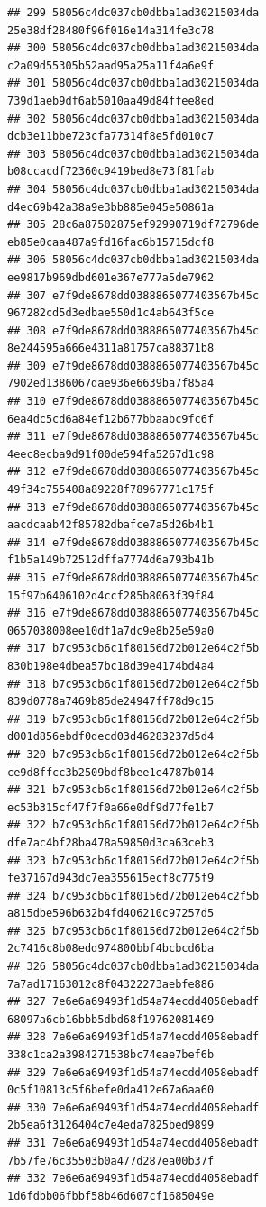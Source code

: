 \documentclass[]{article}
\begin{document}
\begin{verbatim}
## 299 58056c4dc037cb0dbba1ad30215034da     25e38df28480f96f016e14a314fe3c78
## 300 58056c4dc037cb0dbba1ad30215034da     c2a09d55305b52aad95a25a11f4a6e9f
## 301 58056c4dc037cb0dbba1ad30215034da     739d1aeb9df6ab5010aa49d84ffee8ed
## 302 58056c4dc037cb0dbba1ad30215034da     dcb3e11bbe723cfa77314f8e5fd010c7
## 303 58056c4dc037cb0dbba1ad30215034da     b08ccacdf72360c9419bed8e73f81fab
## 304 58056c4dc037cb0dbba1ad30215034da     d4ec69b42a38a9e3bb885e045e50861a
## 305 28c6a87502875ef92990719df72796de     eb85e0caa487a9fd16fac6b15715dcf8
## 306 58056c4dc037cb0dbba1ad30215034da     ee9817b969dbd601e367e777a5de7962
## 307 e7f9de8678dd0388865077403567b45c     967282cd5d3edbae550d1c4ab643f5ce
## 308 e7f9de8678dd0388865077403567b45c     8e244595a666e4311a81757ca88371b8
## 309 e7f9de8678dd0388865077403567b45c     7902ed1386067dae936e6639ba7f85a4
## 310 e7f9de8678dd0388865077403567b45c     6ea4dc5cd6a84ef12b677bbaabc9fc6f
## 311 e7f9de8678dd0388865077403567b45c     4eec8ecba9d91f00de594fa5267d1c98
## 312 e7f9de8678dd0388865077403567b45c     49f34c755408a89228f78967771c175f
## 313 e7f9de8678dd0388865077403567b45c     aacdcaab42f85782dbafce7a5d26b4b1
## 314 e7f9de8678dd0388865077403567b45c     f1b5a149b72512dffa7774d6a793b41b
## 315 e7f9de8678dd0388865077403567b45c     15f97b6406102d4ccf285b8063f39f84
## 316 e7f9de8678dd0388865077403567b45c     0657038008ee10df1a7dc9e8b25e59a0
## 317 b7c953cb6c1f80156d72b012e64c2f5b     830b198e4dbea57bc18d39e4174bd4a4
## 318 b7c953cb6c1f80156d72b012e64c2f5b     839d0778a7469b85de24947ff78d9c15
## 319 b7c953cb6c1f80156d72b012e64c2f5b     d001d856ebdf0decd03d46283237d5d4
## 320 b7c953cb6c1f80156d72b012e64c2f5b     ce9d8ffcc3b2509bdf8bee1e4787b014
## 321 b7c953cb6c1f80156d72b012e64c2f5b     ec53b315cf47f7f0a66e0df9d77fe1b7
## 322 b7c953cb6c1f80156d72b012e64c2f5b     dfe7ac4bf28ba478a59850d3ca63ceb3
## 323 b7c953cb6c1f80156d72b012e64c2f5b     fe37167d943dc7ea355615ecf8c775f9
## 324 b7c953cb6c1f80156d72b012e64c2f5b     a815dbe596b632b4fd406210c97257d5
## 325 b7c953cb6c1f80156d72b012e64c2f5b     2c7416c8b08edd974800bbf4bcbcd6ba
## 326 58056c4dc037cb0dbba1ad30215034da     7a7ad17163012c8f04322273aebfe886
## 327 7e6e6a69493f1d54a74ecdd4058ebadf     68097a6cb16bbb5dbd68f19762081469
## 328 7e6e6a69493f1d54a74ecdd4058ebadf     338c1ca2a3984271538bc74eae7bef6b
## 329 7e6e6a69493f1d54a74ecdd4058ebadf     0c5f10813c5f6befe0da412e67a6aa60
## 330 7e6e6a69493f1d54a74ecdd4058ebadf     2b5ea6f3126404c7e4eda7825bed9899
## 331 7e6e6a69493f1d54a74ecdd4058ebadf     7b57fe76c35503b0a477d287ea00b37f
## 332 7e6e6a69493f1d54a74ecdd4058ebadf     1d6fdbb06fbbf58b46d607cf1685049e

\end{verbatim}
\end{document}
